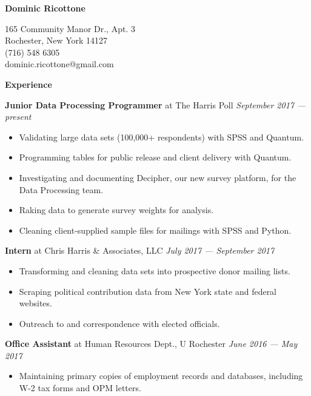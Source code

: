 \documentclass[12pt]{article}
\newenvironment{details}{
\begin{itemize}[label={}]
  \small \setlength{\itemsep}{0pt}
}{\end{itemize}}
\begin{document}
\centering \Huge
\textbf{Dominic Ricottone}

\footnotesize
\begin{multicols}{2}
165 Community Manor Dr., Apt. 3 \\
Rochester, New York 14127 \\
(716) 548 6305 \\
dominic.ricottone@gmail.com
\end{multicols}

\large
\textbf{Experience} \hrulefill

\vspace{.1in}
\normalsize
\textbf{Junior Data Processing Programmer} at The Harris Poll \hfill \textit{September 2017 --- present}
\begin{details}
  \item Validating large data sets (100,000+ respondents) with SPSS and Quantum.
  \item Programming tables for public release and client delivery with Quantum.
  \item Investigating and documenting Decipher, our new survey platform, for the Data Processing team.
  \item Raking data to generate survey weights for analysis.
  \item Cleaning client-supplied sample files for mailings with SPSS and Python.
\end{details}

\vspace{.1in}
\normalsize
\textbf{Intern} at Chris Harris \& Associates, LLC \hfill \textit{July 2017 --- September 2017}
\begin{details}
	\item Transforming and cleaning data sets into prospective donor mailing lists.
	\item Scraping political contribution data from New York state and federal websites.
	\item Outreach to and correspondence with elected officials.
\end{details}

\vspace{.1in}
\normalsize
\textbf{Office Assistant} at Human Resources Dept., U Rochester  \hfill \textit{June 2016 --- May 2017}
\begin{details}
  \item Maintaining primary copies of employment records and databases, including W-2 tax forms and OPM letters.
\end{details}
\end{document}
